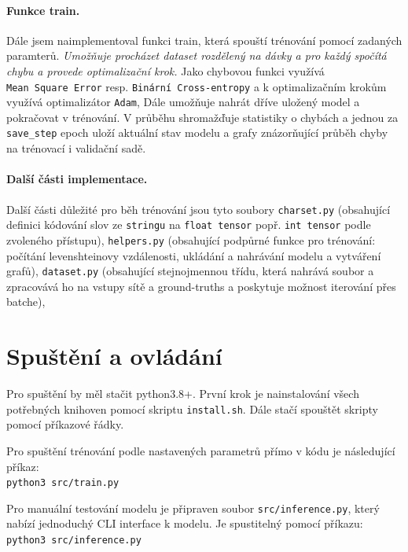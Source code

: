 \documentclass[a4paper]{article}
\theoremstyle{definition}
\begin{document}
\paragraph{Funkce train.}

Dále jsem naimplementoval funkci train, která spouští trénování pomocí zadaných paramterů. \textit{Umožňuje procházet dataset rozdělený na dávky a pro každý spočítá chybu a provede optimalizační krok.} Jako chybovou funkci využívá \texttt{Mean\ Square\ Error} resp. \texttt{Binární Cross-entropy} a k optimalizačním krokům využívá optimalizátor \texttt{Adam}, Dále umožňuje nahrát dříve uložený model a pokračovat v trénování. V průběhu shromažďuje statistiky o chybách a jednou za \texttt{save\_step} epoch uloží aktuální stav modelu a grafy znázorňující průběh chyby na trénovací i validační sadě.

\paragraph{Další části implementace.}

Další části důležité pro běh trénování jsou tyto soubory \texttt{charset.py} (obsahující definici kódování slov ze \texttt{stringu} na \texttt{float tensor} popř. \texttt{int tensor} podle zvoleného přístupu), \texttt{helpers.py} (obsahující podpůrné funkce pro trénování: počítání levenshteinovy vzdálenosti, ukládání a nahrávání modelu a vytváření grafů), \texttt{dataset.py} (obsahující stejnojmennou třídu, která nahrává soubor a zpracovává ho na vstupy sítě a ground-truths a poskytuje možnost iterování přes batche),


\section{Spuštění a ovládání}

Pro spuštění by měl stačit python3.8+. První krok je nainstalování všech potřebných knihoven pomocí skriptu \texttt{install.sh}. Dále stačí spouštět skripty pomocí příkazové řádky.

Pro spuštění trénování podle nastavených parametrů přímo v kódu je následující příkaz: \\
\texttt{python3 src/train.py}

Pro manuální testování modelu je připraven soubor \texttt{src/inference.py}, který nabízí jednoduchý CLI interface k modelu. Je spustitelný pomocí příkazu: \\
\texttt{python3 src/inference.py}
\end{document}

